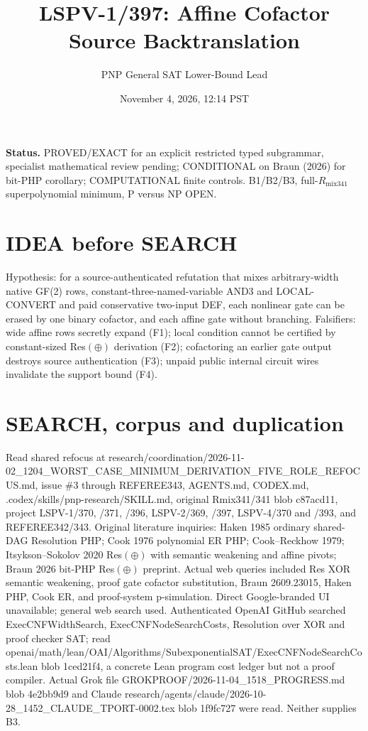\documentclass[11pt]{article}
\title{LSPV-1/397: Affine Cofactor Source Backtranslation}
\author{PNP General SAT Lower-Bound Lead}
\date{November 4, 2026, 12:14 PST}
\begin{document}
\maketitle
\noindent\textbf{Status.} PROVED/EXACT for an explicit restricted typed subgrammar, specialist mathematical review pending; CONDITIONAL on Braun (2026) for bit-PHP corollary; COMPUTATIONAL finite controls. B1/B2/B3, full-$R_{\mathrm{mix341}}$ superpolynomial minimum, P versus NP OPEN.

\section*{IDEA before SEARCH}
Hypothesis: for a source-authenticated refutation that mixes arbitrary-width native GF(2) rows, constant-three-named-variable AND3 and LOCAL-CONVERT and paid conservative two-input DEF, each nonlinear gate can be erased by one binary cofactor, and each affine gate without branching. Falsifiers: wide affine rows secretly expand (F1); local condition cannot be certified by constant-sized Res$(\oplus)$ derivation (F2); cofactoring an earlier gate output destroys source authentication (F3); unpaid public internal circuit wires invalidate the support bound (F4).

\section*{SEARCH, corpus and duplication}
Read shared refocus at research/coordination/2026-11-02_1204_WORST_CASE_MINIMUM_DERIVATION_FIVE_ROLE_REFOCUS.md, issue \#3 through REFEREE343, AGENTS.md, CODEX.md, .codex/skills/pnp-research/SKILL.md, original Rmix341/341 blob c87acd11, project LSPV-1/370, /371, /396, LSPV-2/369, /397, LSPV-4/370 and /393, and REFEREE342/343. Original literature inquiries: Haken 1985 ordinary shared-DAG Resolution PHP; Cook 1976 polynomial ER PHP; Cook--Reckhow 1979; Itsykson--Sokolov 2020 Res$(\oplus)$ with semantic weakening and affine pivots; Braun 2026 bit-PHP Res$(\oplus)$ preprint. Actual web queries included Res XOR semantic weakening, proof gate cofactor substitution, Braun 2609.23015, Haken PHP, Cook ER, and proof-system p-simulation. Direct Google-branded UI unavailable; general web search used. Authenticated OpenAI GitHub searched ExecCNFWidthSearch, ExecCNFNodeSearchCosts, Resolution over XOR and proof checker SAT; read openai/math/lean/OAI/Algorithms/SubexponentialSAT/ExecCNFNodeSearchCosts.lean blob 1ced21f4, a concrete Lean program cost ledger but not a proof compiler. Actual Grok file GROKPROOF/2026-11-04_1518_PROGRESS.md blob 4e2bb9d9 and Claude research/agents/claude/2026-10-28_1452_CLAUDE_TPORT-0002.tex blob 1f9fc727 were read. Neither supplies B3.
\end{document}
